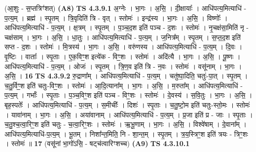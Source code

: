 \documentclass[17pt]{extarticle}
\begin{document}
                  \newline
                      (आ॒शुः - स॒प्तत्रिꣳ॑शत्)  \textbf{(A8)} \newline \newline
                                \textbf{ TS 4.3.9.1} \newline
                  अ॒ग्नेः । भा॒गः । अ॒सि॒ । दी॒क्षायाः᳚ । आधि॑पत्य॒मित्याधि॑ - प॒त्य॒म् । ब्रह्म॑ । स्पृ॒तम् । त्रि॒वृदिति॑ त्रि - वृत् । स्तोमः॑ । इन्द्र॑स्य । भा॒गः । अ॒सि॒ । विष्णोः᳚ । आधि॑पत्य॒मित्याधि॑ - प॒त्य॒म् । क्ष॒त्रम् । स्पृ॒तम् । प॒ञ्च॒द॒श इति॑ पञ्च - द॒शः । स्तोमः॑ । नृ॒चक्ष॑सा॒मिति॑ नृ - चक्ष॑साम् । भा॒गः । अ॒सि॒ । धा॒तुः । आधि॑पत्य॒मित्याधि॑ - प॒त्य॒म् । ज॒नित्र᳚म् । स्पृ॒तम् । स॒प्त॒द॒श इति॑ सप्त - द॒शः । स्तोमः॑ । मि॒त्रस्य॑ । भा॒गः । अ॒सि॒ । वरु॑णस्य । आधि॑पत्य॒मित्याधि॑ - प॒त्य॒म् । दि॒वः । वृ॒ष्टिः । वाताः᳚ । स्पृ॒ताः । ए॒क॒विꣳ॒॒श इत्ये॑क - विꣳ॒॒शः । स्तोमः॑ । अदि॑त्यै । भा॒गः । अ॒सि॒ । पू॒ष्णः । आधि॑पत्य॒मित्याधि॑ - प॒त्य॒म् । ओजः॑ । स्पृ॒तम् । त्रि॒ण॒व इति॑ त्रि - न॒वः । स्तोमः॑ । वसू॑नाम् । भा॒गः । अ॒सि॒ । \textbf{  16} \newline
                  \newline
                                \textbf{ TS 4.3.9.2} \newline
                  रु॒द्राणा᳚म् । आधि॑पत्य॒मित्याधि॑ - प॒त्य॒म् । चतु॑ष्पा॒दिति॒ चतुः॑-पा॒त् । स्पृ॒तम् । च॒तु॒र्विꣳ॒॒श इति॑ चतुः-विꣳ॒॒शः । स्तोमः॑ । आ॒दि॒त्याना᳚म् । भा॒गः । अ॒सि॒ । म॒रुता᳚म् । आधि॑पत्य॒मित्याधि॑ - प॒त्य॒म् । गर्भाः᳚ । स्पृ॒ताः । प॒ञ्च॒विꣳ॒॒श इति॑ पञ्च - विꣳ॒॒शः । स्तोमः॑ । दे॒वस्य॑ । स॒वि॒तुः । भा॒गः । अ॒सि॒ । बृह॒स्पतेः᳚ । आधि॑पत्य॒मित्याधि॑ - प॒त्य॒म् । स॒मीचीः᳚ । दिशः॑ । स्पृ॒ताः । च॒तु॒ष्टो॒म इति॑ चतुः-स्तो॒मः । स्तोमः॑ । यावा॑नाम् । भा॒गः । अ॒सि॒ । अया॑वानाम् । आधि॑पत्य॒मित्याधि॑ - प॒त्य॒म् । प्र॒जा इति॑ प्र - जाः । स्पृ॒ताः । च॒तु॒श्च॒त्वा॒रिꣳ॒॒श इति॑ चतुः - च॒त्वा॒रिꣳ॒॒शः । स्तोमः॑ । ऋ॒भू॒णाम् । भा॒गः । अ॒सि॒ । विश्वे॑षाम् । दे॒वाना᳚म् । आधि॑पत्य॒मित्याधि॑-प॒त्य॒म् । भू॒तम् । निशा᳚न्त॒मिति॒ नि - शा॒न्त॒म् । स्पृ॒तम् । त्र॒य॒स्त्रिꣳ॒॒श इति॑ त्रयः - त्रिꣳ॒॒शः । स्तोमः॑ ॥ \textbf{  17} \newline
                  \newline
                      (वसू॑नां भा॒गो॑ऽसि॒ - षट्च॑त्वारिꣳशच्च)  \textbf{(A9)} \newline \newline
                                \textbf{ TS 4.3.10.1} \newline
\end{document}
